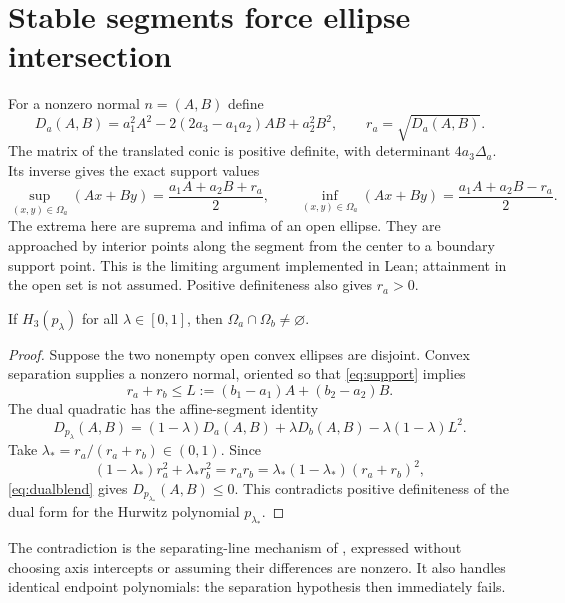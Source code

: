 \documentclass[11pt]{article}
\begin{document}
\section{Stable segments force ellipse intersection}
For a nonzero normal $n=(A,B)$ define
\begin{equation}\label{eq:dual}
 D_a(A,B)=a_1^2A^2-2(2a_3-a_1a_2)AB+a_2^2B^2,
 \qquad r_a=\sqrt{D_a(A,B)}.
\end{equation}
The matrix of the translated conic is positive definite, with determinant $4a_3\Delta_a$. Its inverse gives the exact support values
\begin{equation}\label{eq:support}
 \sup_{(x,y)\in\Omega_a}(Ax+By)
 =\frac{a_1A+a_2B+r_a}{2},\qquad
 \inf_{(x,y)\in\Omega_a}(Ax+By)
 =\frac{a_1A+a_2B-r_a}{2}.
\end{equation}
The extrema here are suprema and infima of an open ellipse. They are approached by interior points along the segment from the center to a boundary support point. This is the limiting argument implemented in Lean; attainment in the open set is not assumed. Positive definiteness also gives $r_a>0$.

\begin{lemma}\label{lem:intersection}
If $H_3(p_\lambda)$ for all $\lambda\in[0,1]$, then $\Omega_a\cap\Omega_b\ne\varnothing$.
\end{lemma}
\begin{proof}
Suppose the two nonempty open convex ellipses are disjoint. Convex separation supplies a nonzero normal, oriented so that \eqref{eq:support} implies
\[
 r_a+r_b\le L:=(b_1-a_1)A+(b_2-a_2)B.
\]
The dual quadratic has the affine-segment identity
\begin{equation}\label{eq:dualblend}
 D_{p_\lambda}(A,B)
 =(1-\lambda)D_a(A,B)+\lambda D_b(A,B)
 -\lambda(1-\lambda)L^2.
\end{equation}
Take $\lambda_*=r_a/(r_a+r_b)\in(0,1)$. Since
\[
 (1-\lambda_*)r_a^2+\lambda_*r_b^2=r_ar_b
 =\lambda_*(1-\lambda_*)(r_a+r_b)^2,
\]
\eqref{eq:dualblend} gives $D_{p_{\lambda_*}}(A,B)\le0$. This contradicts positive definiteness of the dual form for the Hurwitz polynomial $p_{\lambda_*}$.
\end{proof}

The contradiction is the separating-line mechanism of \cite[Lemma~6]{yuHuang1999}, expressed without choosing axis intercepts or assuming their differences are nonzero. It also handles identical endpoint polynomials: the separation hypothesis then immediately fails.
\end{document}
